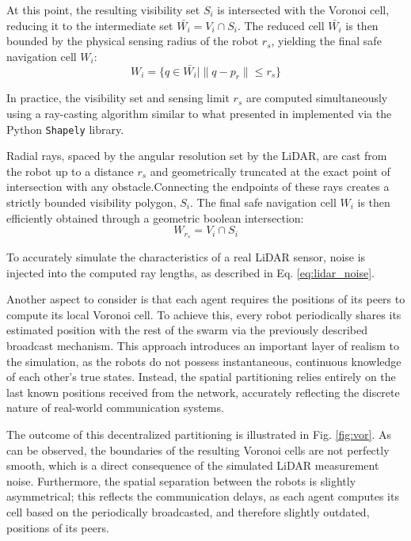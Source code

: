 \documentclass[times, twoside]{zHenriquesLab-StyleBioRxiv}
\begin{document}
At this point, the resulting visibility set $S_i$ is intersected with the Voronoi cell, reducing it to the intermediate set $\bar{W_i}= V_i \cap S_i$. The reduced cell $\bar{W_i}$ is then bounded by the physical sensing radius of the robot $r_s$, yielding the final safe navigation cell $W_{i}$:
\begin{equation}
    W_{i} = \{q \in\bar{W_i} \mid \|q - p_r\| \leq r_s\}
    \label{eq:trimmed_cell}
\end{equation}

In practice, the visibility set and sensing limit $r_s$ are computed simultaneously using a ray-casting algorithm  similar to what presented in \cite{raycast} implemented via the Python \texttt{Shapely} library.

Radial rays, spaced by the angular resolution set by the LiDAR, are cast from the robot up to a distance $r_s$ and geometrically truncated at the exact point of intersection with any obstacle.Connecting the endpoints of these rays creates a strictly bounded visibility polygon, $S_i$. The final safe navigation cell $W_{i}$ is then efficiently obtained through a geometric boolean intersection:
\begin{equation}
    W_{r_s} = V_i \cap S_i
    \label{eq:final_safe_cell}
\end{equation}

To accurately simulate the characteristics of a real LiDAR sensor, noise is injected into the computed ray lengths, as described in Eq. \ref{eq:lidar_noise}.

Another aspect to consider is that each agent requires the positions of its peers to compute its local Voronoi cell. To achieve this, every robot periodically shares its estimated position with the rest of the swarm via the previously described broadcast mechanism. This approach introduces an important layer of realism to the simulation, as the robots do not possess instantaneous, continuous knowledge of each other's true states. Instead, the spatial partitioning relies entirely on the last known positions received from the network, accurately reflecting the discrete nature of real-world communication systems.

The outcome of this decentralized partitioning is illustrated in Fig. \ref{fig:vor}. As can be observed, the boundaries of the resulting Voronoi cells are not perfectly smooth, which is a direct consequence of the simulated LiDAR measurement noise. Furthermore, the spatial separation between the robots is slightly asymmetrical; this reflects the communication delays, as each agent computes its cell based on the periodically broadcasted, and therefore slightly outdated, positions of its peers.
\end{document}
